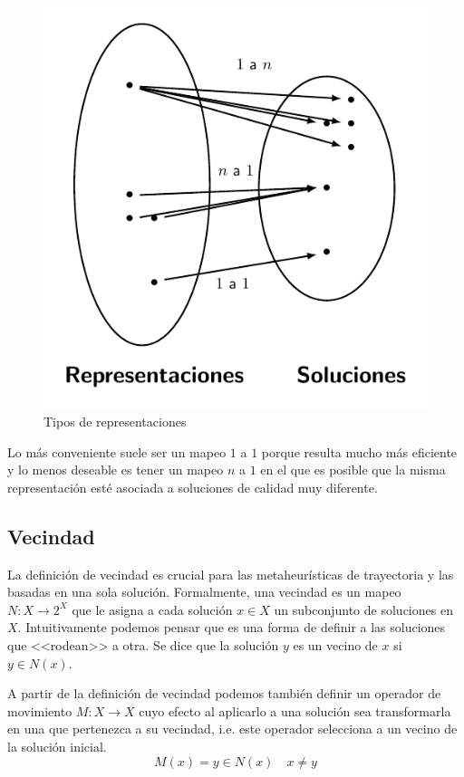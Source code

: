 \begin{figure}[H]
    \centering
    \includegraphics[scale=1]{Imagenes/representacion.pdf}
    \caption{Tipos de representaciones}
\end{figure}

Lo más conveniente suele ser un mapeo $1$ a $1$ porque resulta mucho más eficiente y lo menos deseable es tener un mapeo $n$ a $1$ en el que es posible que la misma representación esté asociada a soluciones de calidad muy diferente. 


\subsection{Vecindad}
La definición de vecindad es crucial para las metaheurísticas de trayectoria y las basadas en una sola solución.
Formalmente, una vecindad es un mapeo $N:X\rightarrow 2^X$ que le asigna a cada solución $x\in X$ un subconjunto de soluciones en $X$. Intuitivamente podemos pensar que es una forma de definir a las soluciones que <<rodean>> a otra. Se dice que la solución $y$ es un vecino de $x$ si $y\in N(x)$.

A partir de la definición de vecindad podemos también definir un operador de movimiento $M:X\rightarrow X$ cuyo efecto al aplicarlo a una solución sea transformarla en una que pertenezca a su vecindad, i.e. este operador selecciona a un vecino de la solución inicial.  
\[M(x)=y\in N(x)\quad x\neq y\]

